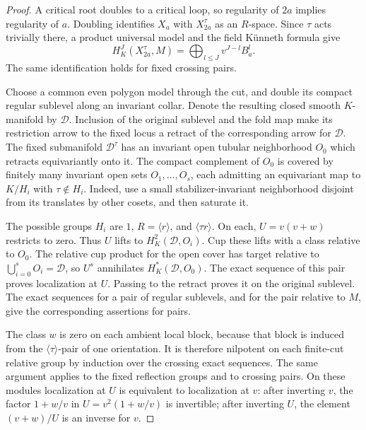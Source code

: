 \begin{proof}
A critical root doubles to a critical loop, so regularity of $2a$
implies regularity of $a$. Doubling identifies $X_a$ with
$X_{2a}^{\tau}$ as an $R$-space. Since $\tau$ acts trivially there, a
product universal model and the field K\"unneth formula give
\begin{equation}\label{bud:fixed-product}
 H_K^J(X_{2a}^{\tau},M)
 =\bigoplus_{l\le J}v^{J-l}B_a^l.
\end{equation}
The same identification holds for fixed crossing pairs.

Choose a common even polygon model through the cut, and double its
compact regular sublevel along an invariant collar. Denote the resulting
closed smooth $K$-manifold by $\mathcal D$. Inclusion of the original
sublevel and the fold map make its restriction arrow to the fixed locus
a retract of the corresponding arrow for $\mathcal D$. The fixed
submanifold $\mathcal D^\tau$ has an invariant open tubular neighborhood
$O_0$ which retracts equivariantly onto it. The compact complement of
$O_0$ is covered by finitely many invariant open sets $O_1,\ldots,O_s$,
each admitting an equivariant map to $K/H_i$ with $\tau\notin H_i$.
Indeed, use a small stabilizer-invariant neighborhood disjoint from its
translates by other cosets, and then saturate it.

The possible groups $H_i$ are $1$, $R=\langle r\rangle$, and
$\langle\tau r\rangle$.
On each, $U=v(v+w)$ restricts to zero. Thus $U$ lifts to
$H_K^2(\mathcal D,O_i)$. Cup these lifts with a class relative to $O_0$.
The relative cup product for the open cover has target relative to
$\bigcup_{i=0}^sO_i=\mathcal D$, so $U^s$ annihilates
$H_K^*(\mathcal D,O_0)$. The exact sequence of this pair proves
localization at $U$. Passing to the retract proves it on the original
sublevel. The exact sequences for a pair of regular sublevels, and for
the pair relative to $M$, give the corresponding assertions for pairs.

The class $w$ is zero on each ambient local block, because that block
is induced from the $\langle\tau\rangle$-pair of one orientation.
It is therefore nilpotent on each finite-cut relative group by induction
over the crossing exact sequences. The same argument applies to the
fixed reflection groups and to crossing pairs. On these modules
localization at $U$ is equivalent to localization at $v$: after
inverting $v$, the factor $1+w/v$ in $U=v^2(1+w/v)$ is invertible;
after inverting $U$, the element $(v+w)/U$ is an inverse for $v$.


\end{proof}
